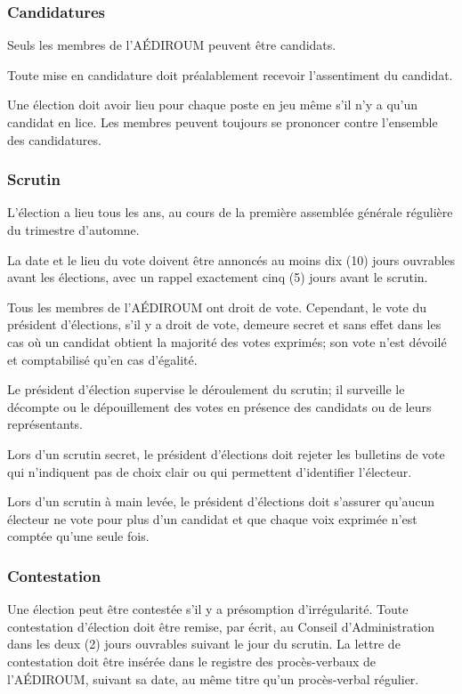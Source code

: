\documentclass{aediroum}
\begin{document}
\subsubsection{Candidatures}\label{sec:candidatures}
Seuls les membres de l'AÉDIROUM peuvent être candidats.

Toute mise en candidature doit préalablement recevoir l'assentiment du candidat.

Une élection doit avoir lieu pour chaque poste en jeu même s'il n'y a qu'un candidat en lice. Les membres peuvent toujours se prononcer contre l'ensemble des candidatures.

\subsubsection{Scrutin}\label{sec:scrutin-elections}

L'élection a lieu tous les ans, au cours de la première assemblée générale régulière du trimestre d'automne.

La date et le lieu du vote doivent être annoncés au moins dix (10) jours ouvrables avant les élections, avec un rappel exactement cinq (5) jours avant le scrutin.

Tous les membres de l'AÉDIROUM ont droit de vote. Cependant, le vote du président d'élections, s'il y a droit de vote, demeure secret et sans effet dans les cas où un candidat obtient la majorité des votes exprimés; son vote n'est dévoilé et comptabilisé qu'en cas d'égalité.

Le président d'élection supervise le déroulement du scrutin; il surveille le décompte ou le dépouillement des votes en présence des candidats ou de leurs représentants.

Lors d'un scrutin secret, le président d'élections doit rejeter les bulletins de vote qui n'indiquent pas de choix clair ou qui permettent d'identifier l'électeur.

Lors d'un scrutin à main levée, le président d'élections doit s'assurer qu'aucun électeur ne vote pour plus d'un candidat et que chaque voix exprimée n'est comptée qu'une seule fois.

\subsubsection{Contestation}\label{sec:contestation}

Une élection peut être contestée s'il y a présomption d'irrégularité. Toute contestation d'élection doit être remise, par écrit, au Conseil d'Administration dans les deux (2) jours ouvrables suivant le jour du scrutin. La lettre de contestation doit être insérée dans le registre des procès-verbaux de l'AÉDIROUM, suivant sa date, au même titre qu'un procès-verbal régulier.
\end{document}
